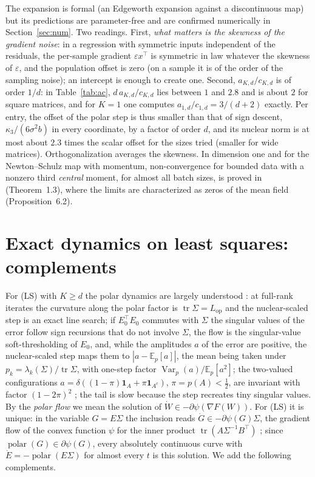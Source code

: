 \documentclass[11pt]{article}
\theoremstyle{remark}
\newcommand{\E}{\mathbb{E}}
\newcommand{\abs}[1]{\left|#1\right|}
\newcommand{\tr}{\operatorname{tr}}
\newcommand{\polar}{\operatorname{polar}}
\newcommand{\Var}{\operatorname{Var}}
\newcommand{\Lop}{L_{\mathrm{op}}}
\newcommand{\ones}{\mathbf{1}}
\begin{document}
The expansion is formal (an Edgeworth expansion against a discontinuous map) but its predictions are parameter-free and
are confirmed numerically in Section~\ref{sec:num}. Two readings. First, \emph{what matters is the skewness of the
gradient noise}: in a regression with symmetric inputs independent of the residuals, the per-sample gradient
$\varepsilon x^\top$ is symmetric in law whatever the skewness of $\varepsilon$, and the population offset is zero (on a
sample it is of the order of the sampling noise); an intercept is enough to create one. Second,
$a_{K,d}/c_{K,d}$ is of order $1/d$: in Table~\ref{tab:ac}, $d\,a_{K,d}/c_{K,d}$ lies between $1$ and $2.8$ and is about
$2$ for square matrices, and for $K=1$ one computes $a_{1,d}/c_{1,d}=3/(d+2)$ exactly. Per entry, the offset of the polar
step is thus smaller than that of sign descent, $\kappa_3/(6\sigma^2b)$ in every coordinate, by a factor of order $d$,
and its nuclear norm is at most about $2.3$ times the scalar offset for the sizes tried (smaller for wide matrices).
Orthogonalization averages the skewness. In dimension one and for the Newton--Schulz map with momentum,
non-convergence for bounded data with a nonzero third \emph{central} moment, for almost all batch sizes, is proved in
\cite{do2026muon} (Theorem~1.3), where the limits are characterized as zeros of the mean field (Proposition~6.2).

\section{Exact dynamics on least squares: complements}\label{sec:ls}

For (LS) with $K\ge d$ the polar dynamics are largely understood \cite{shulgin2026quadratic,vasudeva2025muon}: at
full-rank iterates the curvature along the polar factor is $\tr\Sigma=\Lop$ and the nuclear-scaled step is an exact
line search; if $E_0^\top E_0$ commutes with $\Sigma$ the singular values of the error follow sign recursions that do
not involve $\Sigma$, the flow is the singular-value soft-thresholding of $E_0$, and, while the amplitudes $a$ of the
error are positive, the nuclear-scaled step maps them to $\abs{a-\E_p[a]}$, the mean being taken under
$p_k=\lambda_k(\Sigma)/\tr\Sigma$, with one-step factor $\Var_p(a)/\E_p[a^2]$; the two-valued configurations
$a=\delta((1-\pi)\ones_A+\pi\ones_{A^c})$, $\pi=p(A)<\frac12$, are invariant with factor $(1-2\pi)^2$
\cite{shulgin2026quadratic,wang2026why}; the tail is slow because the step recreates tiny singular values. By the
\emph{polar flow} we mean the solution of $\dot W\in-\partial\psi(\nabla F(W))$. For (LS) it is unique: in the variable
$G=E\Sigma$ the inclusion reads $\dot G\in-\partial\psi(G)\Sigma$, the gradient flow of the convex function $\psi$ for the
inner product $\tr(A\Sigma^{-1}B^\top)$ \cite{brezis1973operateurs,bungert2021nonlinear}; since
$\polar(G)\in\partial\psi(G)$, every absolutely continuous curve with $\dot E=-\polar(E\Sigma)$ for almost every $t$ is
this solution. We add the following complements.
\end{document}
